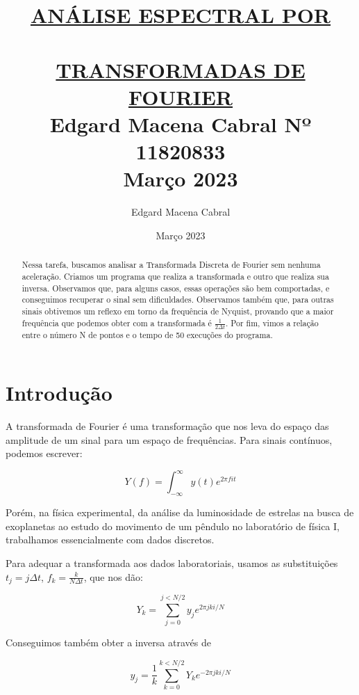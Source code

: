 \documentclass[11pt]{article}
\author{Edgard Macena Cabral}
\date{Março 2023}
\title{\href{https://edisciplinas.usp.br/pluginfile.php/7581904/mod\_resource/content/1/projeto-fiscompII-primeiro-2023-completo.pdf}{ANÁLISE ESPECTRAL POR\\  \\ TRANSFORMADAS DE FOURIER}\\\medskip
\large Edgard Macena Cabral Nº 11820833 \\  Março 2023}
\begin{document}
\maketitle
\begin{abstract}
Nessa tarefa, buscamos analisar a Transformada Discreta de Fourier sem nenhuma aceleração. Criamos um programa que realiza a transformada e outro que realiza sua inversa.
Observamos que, para alguns casos, essas operações são bem comportadas, e conseguimos recuperar o sinal sem dificuldades.
Observamos também que, para outras sinais obtivemos um reflexo em torno da frequência de Nyquist, provando que a maior frequência que podemos obter com a transformada é \(\frac{1}{2\Delta t}\).
Por fim, vimos a relação entre o número N de pontos e o tempo de 50 execuções do programa.
\end{abstract}
\section*{Introdução}
\label{sec:orgbcf407c}
A transformada de Fourier é uma transformação que nos leva do espaço das amplitude de um sinal para um espaço de frequências. Para sinais contínuos, podemos escrever:

\begin{latex}
\begin{equation}
Y(f) = \int^{\infty}_{-\infty}y(t)e^{2\pi f i t}
\end{equation}
\end{latex}

Porém, na física experimental, da análise da luminosidade de estrelas na busca de exoplanetas ao estudo do movimento de um pêndulo no laboratório de física I, trabalhamos essencialmente com dados discretos.

Para adequar a transformada aos dados laboratoriais, usamos as substituições \(t_j = j\Delta t\), \(f_k = \frac{k}{N\Delta t}\), que nos dão:

\begin{latex}
\begin{equation}
\label{eq:Transformada discreta}
Y_k = \sum_{j=0}^{j < N/2} y_j e^{2\pi jk i/N}
\end{equation}
\end{latex}

Conseguimos também obter a inversa através de

\begin{latex}
\begin{equation}
\label{eq:Transformada inversa discreta}
y_j = \frac{1}{k}\sum_{k=0}^{k < N/2} Y_ke^{-2\pi jk i/N}
\end{equation}
\end{latex}
\end{document}
